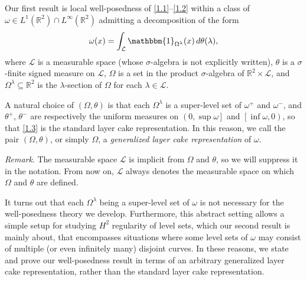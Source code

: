 \documentclass[reqno,centertags,12pt]{amsart}
\theoremstyle{definition}
\numberwithin{equation}{section}
\newcommand{\bbR}{{\mathbb{R}}}
\begin{document}
Our first result is local well-posedness of \eqref{1.1}--\eqref{1.2}
within a class of $\omega\in L^{1}(\bbR^{2})\cap L^{\infty}(\bbR^{2})$
admitting a decomposition of the form
\begin{equation}\label{1.3}
    \omega(x) = \int_{\mathcal{L}}\mathbbm{1}_{\Omega^{\lambda}}(x)\,d\theta(\lambda),
\end{equation}
where $\mathcal{L}$ is a measurable space (whose $\sigma$-algebra is not explicitly written),
$\theta$ is a $\sigma$-finite signed measure on $\mathcal{L}$, $\Omega$ is a set in
the product $\sigma$-algebra of $\bbR^{2}\times\mathcal{L}$,
and $\Omega^{\lambda}\subseteq\bbR^{2}$ is the $\lambda$-section of $\Omega$
for each $\lambda\in\mathcal{L}$.

A natural choice of $(\Omega,\theta)$ is that each $\Omega^{\lambda}$
is a super-level set of $\omega^{+}$ and $\omega^{-}$, and
$\theta^{+}$, $\theta^{-}$ are respectively the uniform measures on
$\left(0,\sup\omega\right]$ and
$\left[\inf\omega,0\right)$, so that \eqref{1.3}
is the standard layer cake representation.
In this reason, we call the pair $(\Omega,\theta)$, or simply $\Omega$,
a \emph{generalized layer cake representation} of $\omega$.\smallskip

\textit{Remark}. The measurable space $\mathcal{L}$ is implicit from $\Omega$ and $\theta$,
so we will suppress it in the notation. From now on, $\mathcal{L}$ always
denotes the measurable space on which $\Omega$ and $\theta$ are defined.\smallskip

It turns out that each $\Omega^{\lambda}$ being a super-level set of $\omega$
is not necessary for the well-posedness theory we develop.
Furthermore, this abstract setting allows a simple setup for
studying $H^{2}$ regularity of level sets, which our second result is mainly about,
that encompasses situations where some level sets of $\omega$
may consist of multiple (or even infinitely many) disjoint curves.
In these reasons, we state and prove our well-posedness result in terms of
an arbitrary generalized layer cake representation, rather than
the standard layer cake representation.
\end{document}
